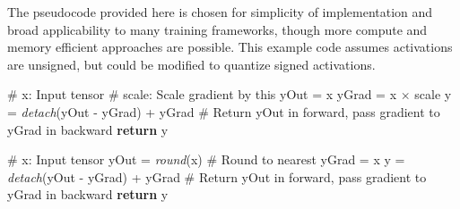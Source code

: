 \documentclass{article}
\begin{document}
The pseudocode provided here is chosen for simplicity of implementation and broad applicability to many training frameworks, though more compute and memory efficient approaches are possible.
%
This example code assumes activations are unsigned, but could be modified to quantize signed activations.
%


\setcounter{algorithm}{0}

\begin{algorithm}
   \caption{gradscale(x, scale):}
   \label{alg:gradscale}
\begin{algorithmic}
   \STATE \# x: Input tensor   
   \STATE \# scale: Scale gradient by this
   \STATE yOut = x
   \STATE yGrad = x $\times$ scale
   \STATE y = \textit{detach}(yOut - yGrad) + yGrad \# Return yOut in forward, pass gradient to yGrad in backward
   \STATE \textbf{return} y
\end{algorithmic}
\end{algorithm}

\begin{algorithm}
   \caption{roundpass(x):}
   \label{alg:roundpass}
\begin{algorithmic}
   \STATE \# x: Input tensor   
   \STATE yOut = \textit{round}(x) \# Round to nearest
   \STATE yGrad = x
   \STATE y = \textit{detach}(yOut - yGrad) + yGrad \# Return yOut in forward, pass gradient to yGrad in backward
   \STATE \textbf{return} y
\end{algorithmic}
\end{algorithm}
\end{document}
